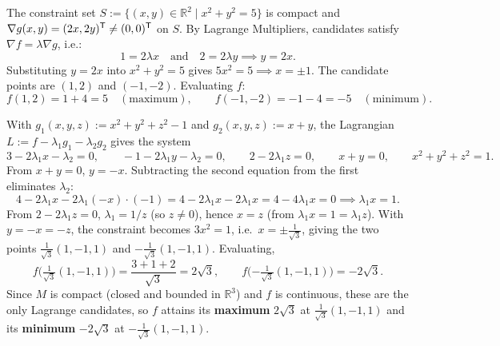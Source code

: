 \begin{exercisesolution}
\label{sol:ai_lagrange_circle}
The constraint set $S := \{(x,y) \in \mathbb{R}^2 \mid x^2 + y^2 = 5\}$ is compact and $\nabla g(x,y) = (2x, 2y)^{\mathsf{T}} \neq (0,0)^{\mathsf{T}}$ on $S$. By Lagrange Multipliers, candidates satisfy $\nabla f = \lambda \nabla g$, i.e.:
\[
1 = 2\lambda x \quad \text{and} \quad 2 = 2\lambda y \implies y = 2x.
\]
Substituting $y = 2x$ into $x^2 + y^2 = 5$ gives $5x^2 = 5 \implies x = \pm 1$. The candidate points are $(1,2)$ and $(-1,-2)$. Evaluating $f$:
\[
f(1,2) = 1 + 4 = 5 \quad (\text{maximum}), \qquad f(-1,-2) = -1 - 4 = -5 \quad (\text{minimum}).
\]
\end{exercisesolution}

\begin{exercisesolution}
\label{sol:lagrange_sphere_plane}
With $g_1(x,y,z) := x^2+y^2+z^2-1$ and $g_2(x,y,z) := x+y$, the Lagrangian
$L := f - \lambda_1 g_1 - \lambda_2 g_2$ gives the system
\[3 - 2\lambda_1 x - \lambda_2 = 0, \qquad -1-2\lambda_1 y - \lambda_2 = 0, \qquad 2 - 2\lambda_1 z = 0, \qquad x+y=0, \qquad x^2+y^2+z^2=1.\]
From $x+y=0$, $y=-x$. Subtracting the second equation from the first eliminates $\lambda_2$:
\[4 - 2\lambda_1 x - 2\lambda_1(-x) \cdot(-1)= 4-2\lambda_1x-2\lambda_1x=4-4\lambda_1 x = 0 \implies \lambda_1 x = 1.\]
From $2-2\lambda_1 z=0$, $\lambda_1 = 1/z$ (so $z \neq 0$), hence $x = z$ (from $\lambda_1 x = 1 =
\lambda_1 z$). With $y=-x=-z$, the constraint becomes $3x^2 = 1$, i.e.\ $x = \pm\tfrac{1}{\sqrt3}$,
giving the two points $\tfrac{1}{\sqrt3}(1,-1,1)$ and $-\tfrac{1}{\sqrt3}(1,-1,1)$. Evaluating,
\[f\Big(\tfrac{1}{\sqrt3}(1,-1,1)\Big) = \frac{3+1+2}{\sqrt3} = 2\sqrt3, \qquad f\Big({-\tfrac{1}{\sqrt3}}(1,-1,1)\Big) = -2\sqrt3.\]
Since $M$ is compact (closed and bounded in $\mathbb{R}^3$) and $f$ is continuous, these are the
only Lagrange candidates, so $f$ attains its \textbf{maximum} $2\sqrt3$ at $\tfrac{1}{\sqrt3}(1,-1,1)$
and its \textbf{minimum} $-2\sqrt3$ at $-\tfrac{1}{\sqrt3}(1,-1,1)$.
\end{exercisesolution}

